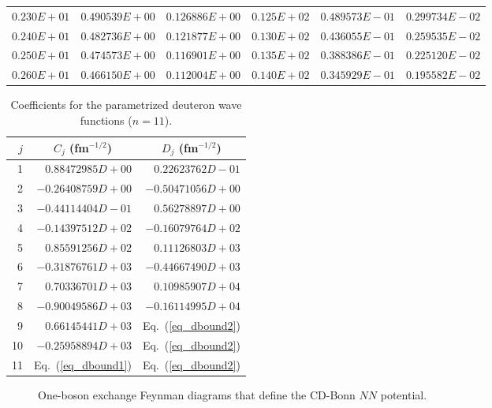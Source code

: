 \begin{table}
\begin{tabular}{rrrrrr}
 $   0.230E+01$ & $    0.490539E+00$ & $    0.126886E+00$ & $   0.125E+02$ & $    0.489573E-01$ & $    0.299734E-02$  \\
 $   0.240E+01$ & $    0.482736E+00$ & $    0.121877E+00$ & $   0.130E+02$ & $    0.436055E-01$ & $    0.259535E-02$  \\
 $   0.250E+01$ & $    0.474573E+00$ & $    0.116901E+00$ & $   0.135E+02$ & $    0.388386E-01$ & $    0.225120E-02$  \\
 $   0.260E+01$ & $    0.466150E+00$ & $    0.112004E+00$ & $   0.140E+02$ & $    0.345929E-01$ & $    0.195582E-02$ 
\end{tabular}
\label{tab_dwaves}
\end{table}

\pagebreak


\begin{table}
\caption{Coefficients for the parametrized
 deuteron wave functions ($n=11$).}
\begin{tabular}{rrr}
   $j$     &
\multicolumn{1}{c}{$C_{j}$ (fm$^{-1/2}$)}  &
\multicolumn{1}{c}{$D_{j}$ (fm$^{-1/2}$)}
\\ \hline 
      1  &$   0.88472985D+00 $&$     0.22623762D-01$\\
      2  &$  -0.26408759D+00 $&$    -0.50471056D+00$\\
      3  &$  -0.44114404D-01 $&$     0.56278897D+00$\\
      4  &$  -0.14397512D+02 $&$    -0.16079764D+02$\\
      5  &$   0.85591256D+02 $&$     0.11126803D+03$\\
      6  &$  -0.31876761D+03 $&$    -0.44667490D+03$\\
      7  &$   0.70336701D+03 $&$     0.10985907D+04$\\
      8  &$  -0.90049586D+03 $&$    -0.16114995D+04$\\
      9  &$   0.66145441D+03 $&
           \multicolumn{1}{c}{Eq.~(\ref{eq_dbound2})}\\
     10  &$  -0.25958894D+03 $&
           \multicolumn{1}{c}{Eq.~(\ref{eq_dbound2})}\\
     11  & \multicolumn{1}{c}{Eq.~(\ref{eq_dbound1})}
         & \multicolumn{1}{c}{Eq.~(\ref{eq_dbound2})}
\end{tabular}
\label{tab_dwpar}
\end{table}

\pagebreak



\begin{figure}
\vspace*{-4.0cm}
\hspace*{-1.0cm}
\vspace*{-11.0cm}
\caption{One-boson exchange Feynman diagrams that define 
the CD-Bonn $NN$ potential.}
\label{fig_OBE}
\end{figure}



